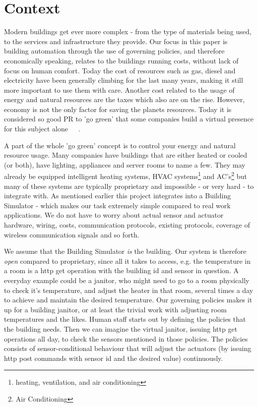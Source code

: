 \section{Context} \label{sec:context}
Modern buildings get ever more complex - from the type of materials being used, to the services and infrastructure they provide. Our focus in this paper is building automation through the use of governing policies, and therefore economically speaking, relates to the buildings running costs, without lack of focus on human comfort. Today the cost of resources such as gas, diesel and electricity have been generally climbing for the last many years, making it still more important to use them with care. Another cost related to the usage of energy and natural resources are the taxes which also are on the rise. However, economy is not the only factor for saving the planets resources. Today it is considered so good PR to 'go green' that some companies build a virtual presence for this subject alone~\cite{green-google}~\cite{green-facebook}~\cite{green-microsoft}.

A part of the whole 'go green' concept is to control your energy and natural resource usage. Many companies have buildings that are either heated or cooled (or both), have lighting, appliances and server rooms to name a few. They may already be equipped intelligent heating systems, HVAC systems\footnote{heating, ventilation, and air conditioning} and AC's\footnote{Air Conditioning} but many of these systems are typically proprietary and impossible - or very hard - to integrate with. As mentioned earlier this project integrates into a Building Simulator - which makes our task extremely simple compared to real work applications. We do not have to worry about actual sensor and actuator hardware, wiring, costs, communication protocols, existing protocols, coverage of wireless communication signals and so forth.

We assume that the Building Simulator \textit{is} the building. Our system is therefore \textit{open} compared to proprietary, since all it takes to access, e.g. the temperature in a room is a http get operation with the building id and sensor in question. A everyday example could be a janitor, who might need to go to a room physically to check it's temperature, and adjust the heater in that room, several times a day to achieve and maintain the desired temperature. Our governing policies makes it up for a building janitor, or at least the trivial work with adjusting room temperatures and the likes. Human staff starts out by defining the policies that the building needs. Then we can imagine the virtual janitor, issuing http get operations all day, to check the sensors mentioned in those policies. The policies consists of sensor-conditional behaviour that will adjust the actuators (by issuing http post commands with sensor id and the desired value) continuously.

